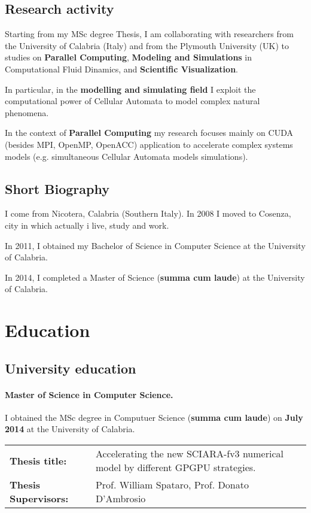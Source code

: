 \documentclass[a4paper,10pt]{article}
\begin{document}
\subsection{Research activity}
Starting from my MSc degree Thesis, I am collaborating with researchers from the
University of Calabria (Italy) and from the Plymouth University (UK) to studies
on \textbf{Parallel Computing}, \textbf{Modeling and
Simulations} in Computational Fluid Dinamics, and \textbf{Scientific Visualization}.

In particular, in the \textbf{modelling and simulating field} I exploit the
computational power of Cellular Automata to model complex natural phenomena.

In the context of \textbf{Parallel Computing} my research focuses mainly on CUDA
(besides MPI, OpenMP, OpenACC) application to accelerate complex systems models
(e.g. simultaneous Cellular Automata models simulations).

\subsection{Short Biography}
I come from Nicotera, Calabria (Southern Italy). In 2008 I moved to Cosenza,
city in which actually i live, study and work.

In 2011, I obtained my Bachelor of Science in Computer Science at the University
of Calabria.

In 2014, I completed a Master of Science (\textbf{summa cum laude}) at the
University of Calabria.


\section{Education}

\subsection{University education}

\paragraph{Master of Science in Computer Science.} 

I obtained the MSc degree in Computuer Science (\textbf{summa cum laude}) on
\textbf{July 2014} at the University of Calabria.\\
{\centering
\begin{tabular}{l l}
\textbf{Thesis title:}&Accelerating the new SCIARA-fv3 numerical model by
different GPGPU strategies.\\
\textbf{Thesis Supervisors:} & Prof. William Spataro, Prof. Donato D'Ambrosio\\
\end{tabular}
}
\end{document}
